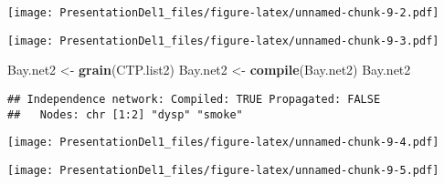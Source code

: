 \documentclass[
]{article}
\newenvironment{Shaded}{\begin{snugshade}}{\end{snugshade}}
\newcommand{\KeywordTok}[1]{\textcolor[rgb]{0.13,0.29,0.53}{\textbf{#1}}}
\newcommand{\NormalTok}[1]{#1}
\newcommand{\OperatorTok}[1]{\textcolor[rgb]{0.81,0.36,0.00}{\textbf{#1}}}
\newcommand{\StringTok}[1]{\textcolor[rgb]{0.31,0.60,0.02}{#1}}
\begin{document}
\begin{Shaded}
\end{Shaded}

\texttt{[image: PresentationDel1\_files/figure-latex/unnamed-chunk-9-2.pdf]}

\begin{Shaded}
\end{Shaded}

\texttt{[image: PresentationDel1\_files/figure-latex/unnamed-chunk-9-3.pdf]}

\begin{Shaded}
\begin{Highlighting}[]
\NormalTok{Bay.net2 <-}\StringTok{ }\KeywordTok{grain}\NormalTok{(CTP.list2)}
\NormalTok{Bay.net2 <-}\StringTok{ }\KeywordTok{compile}\NormalTok{(Bay.net2)}
\NormalTok{Bay.net2}
\end{Highlighting}
\end{Shaded}

\begin{verbatim}
## Independence network: Compiled: TRUE Propagated: FALSE 
##   Nodes: chr [1:2] "dysp" "smoke"
\end{verbatim}

\begin{Shaded}
\end{Shaded}

\texttt{[image: PresentationDel1\_files/figure-latex/unnamed-chunk-9-4.pdf]}

\begin{Shaded}
\end{Shaded}

\texttt{[image: PresentationDel1\_files/figure-latex/unnamed-chunk-9-5.pdf]}
\end{document}
